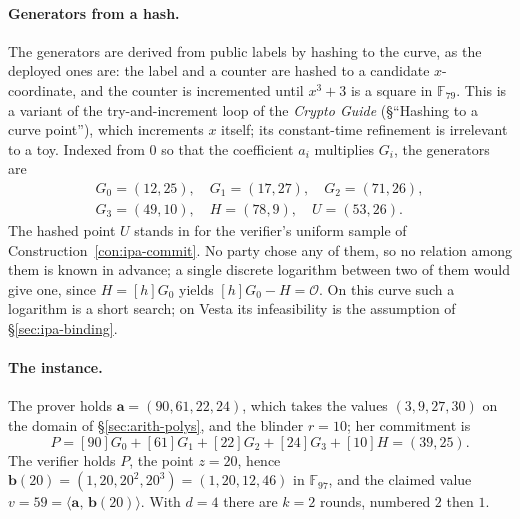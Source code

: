 \documentclass[11pt,a4paper]{article}
\theoremstyle{definition}
\newcommand{\F}{\mathbb{F}}
\newcommand{\ip}[2]{\langle #1,\, #2 \rangle}
\begin{document}
\paragraph{Generators from a hash.}
The generators are derived from public labels by hashing to the curve,
as the deployed ones are: the label and a counter are hashed to a
candidate $x$-coordinate, and the counter is incremented until
$x^3 + 3$ is a square in $\F_{79}$. This is a variant of the
try-and-increment loop of the \emph{Crypto Guide} (\S``Hashing to a
curve point''), which increments $x$ itself; its constant-time
refinement is irrelevant to a toy. Indexed from $0$ so that the
coefficient $a_i$ multiplies $G_i$, the generators are
\begin{gather*}
G_0 = (12, 25),\quad G_1 = (17, 27),\quad G_2 = (71, 26),\\
G_3 = (49, 10),\quad H = (78, 9),\quad U = (53, 26).
\end{gather*}
The hashed point $U$ stands in for the verifier's uniform sample of
Construction~\ref{con:ipa-commit}. No party chose any of them, so no
relation among them is known in advance; a single discrete logarithm
between two of them would give one, since $H = [h]G_0$ yields
$[h]G_0 - H = \mathcal O$. On this curve such a logarithm is a short
search; on Vesta its infeasibility is the assumption of
\S\ref{sec:ipa-binding}.

\paragraph{The instance.}
The prover holds $\mathbf a = (90, 61, 22, 24)$, which takes the values
$(3, 9, 27, 30)$ on the domain of \S\ref{sec:arith-polys}, and the
blinder $r = 10$; her commitment is
\[
P = [90]G_0 + [61]G_1 + [22]G_2 + [24]G_3 + [10]H = (39, 25).
\]
The verifier holds $P$, the point $z = 20$, hence
$\mathbf b(20) = (1, 20, 20^2, 20^3) = (1, 20, 12, 46)$ in $\F_{97}$,
and the claimed value $v = 59 = \ip{\mathbf a}{\mathbf b(20)}$. With
$d = 4$ there are $k = 2$ rounds, numbered $2$ then $1$.
\end{document}

